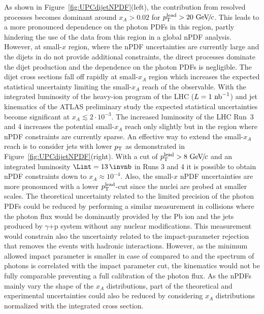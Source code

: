 \documentclass[../report.tex]{subfiles}
\begin{document}
As shown in Figure~\ref{fig:UPCdijetNPDF}(left), the contribution from resolved processes becomes dominant around $x_A > 0.02$ for $p\sb{\scriptstyle\mathrm{T}}^{\mathrm{lead}}>20~\text{GeV}\!/\mspace{-2mu}c$. This leads to a more pronounced dependence on the photon PDFs in this region, partly hindering the use of the data from this region in a global nPDF analysis. However, at small-$x$ region, where the nPDF uncertainties are currently large and the dijets in \pPb do not provide additional constraints, the direct processes dominate the dijet production and the dependence on the photon PDFs is negligible. The dijet cross sections fall off rapidly at small-$x_A$ region which increases the expected statistical uncertainty limiting the small-$x_A$ reach of the observable. With the integrated luminosity of the heavy-ion program of the LHC ($L=1~\text{nb}^{-1}$) and jet kinematics of the ATLAS preliminary study the expected statistical uncertainties become significant at $x_A \lesssim 2 \cdot 10^{-3}$. The increased luminosity of the LHC Run~3 and 4 increases the potential small-$x_A$ reach only slightly but in the region where nPDF constraints are currently sparse. An effective way to extend the small-$x_A$ reach is to consider jets with lower $p\sb{\scriptstyle\mathrm{T}}$ as demonstrated in Figure~\ref{fig:UPCdijetNPDF}(right).
With a cut of $p\sb{\scriptstyle\mathrm{T}}^{\mathrm{lead}}>8~\text{GeV}\!/\mspace{-2mu}c$ and an integrated luminosity $\Lint=13\,\invnb$ in Runs 3 and 4 it is possible to obtain nPDF constraints down to $x_A \approx 10^{-4}$.  Also, the small-$x$ nPDF uncertainties are more pronounced with a lower $p\sb{\scriptstyle\mathrm{T}}^{\mathrm{lead}}$-cut since the nuclei are probed at smaller scales. The theoretical uncertainty related to the limited precision of the photon PDFs could be reduced by performing a similar measurement in \pPb collisions where the photon flux would be dominantly provided by the Pb ion and the jets produced by $\gamma$+p system without any nuclear modifications. This measurement would constrain also the uncertainty related to the impact-parameter rejection that removes the events with hadronic interactions. However, as the minimum allowed impact parameter is smaller in case of \pPb compared to \PbPb and the spectrum of photons is correlated with the impact parameter cut, the kinematics would not be fully comparable preventing a full calibration of the photon flux. As the nPDFs mainly vary the shape of the $x_A$ distributions, part of the theoretical and experimental uncertainties could also be reduced by considering $x_A$ distributions normalized with the integrated cross section.

\end{document}
